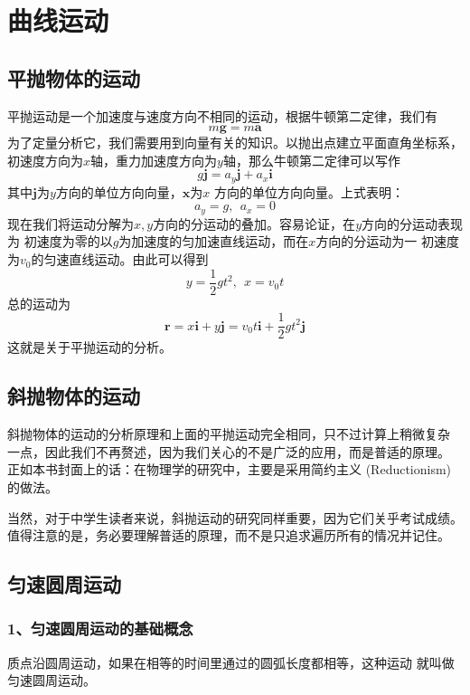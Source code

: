 \section{曲线运动}
\subsection{平抛物体的运动}
平抛运动是一个加速度与速度方向不相同的运动，根据牛顿第二定律，我们有 
\begin{equation}
    m\boldsymbol{g}=m\boldsymbol{a}
\end{equation}
为了定量分析它，我们需要用到向量有关的知识。以抛出点建立平面直角坐标系，
初速度方向为$x$轴，重力加速度方向为$y$轴，那么牛顿第二定律可以写作
\begin{equation}
    g\boldsymbol{j}=a_y\boldsymbol{j}+a_x\boldsymbol{i}
\end{equation}
其中$\boldsymbol{j}$为$y$方向的单位方向向量，$\boldsymbol{x}$为$x$
方向的单位方向向量。上式表明：
\begin{equation}
    a_y=g,~~a_x=0
\end{equation}
现在我们将运动分解为$x,y$方向的分运动的叠加。容易论证，在$y$方向的分运动表现为
初速度为零的以$g$为加速度的匀加速直线运动，而在$x$方向的分运动为一
初速度为$v_0$的匀速直线运动。由此可以得到 
\begin{equation}
    y=\frac{1}{2}gt^2,~~x=v_0t
\end{equation}
总的运动为
\begin{equation}
    \boldsymbol{r}=x\boldsymbol{i}+y\boldsymbol{j}
    =v_0t\boldsymbol{i}+\frac{1}{2}gt^2\boldsymbol{j}
\end{equation}
这就是关于平抛运动的分析。
\subsection{斜抛物体的运动}
斜抛物体的运动的分析原理和上面的平抛运动完全相同，只不过计算上稍微复杂
一点，因此我们不再赘述，因为我们关心的不是广泛的应用，而是普适的原理。
正如本书封面上的话：在物理学的研究中，主要是采用简约主义 (Reductionism) 
的做法。

当然，对于中学生读者来说，斜抛运动的研究同样重要，因为它们关乎考试成绩。
值得注意的是，务必要理解普适的原理，而不是只追求遍历所有的情况并记住。
\subsection{匀速圆周运动}
\subsubsection*{1、匀速圆周运动的基础概念}
\begin{definition}
    质点沿圆周运动，如果在相等的时间里通过的圆弧长度都相等，这种运动
    就叫做匀速圆周运动。
\end{definition}

